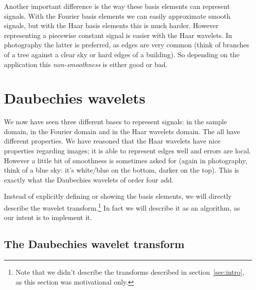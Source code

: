 Another important difference is the way these basis elements can represent signals. With the Fourier basis elements we can easily approximate smooth signals, but with the Haar basis elements this is much harder. However representing a piecewise constant signal is easier with the Haar wavelets. In photography the latter is preferred, as edges are very common (think of branches of a tree against a clear sky or hard edges of a building). So depending on the application this \emph{non-smoothness} is either good or bad.


\section{Daubechies wavelets}
\label{sec:dau}
We now have seen three different bases to represent signals: in the sample domain, in the Fourier domain and in the Haar wavelets domain. The all have different properties. We have reasoned that the Haar wavelets have nice properties regarding images; it is able to represent edges well and errors are local. However a little bit of smoothness is sometimes asked for (again in photography, think of a blue sky: it's white/blue on the bottom, darker on the top). This is exactly what the Daubechies wavelets of order four add.

Instead of explicitly defining or showing the basis elements, we will directly describe the wavelet transform.\footnote{Note that we didn't describe the transforms described in section~\ref{sec:intro}, as this section was motivational only.} In fact we will describe it as an algorithm, as our intent is to implement it.

\subsection{The Daubechies wavelet transform}

